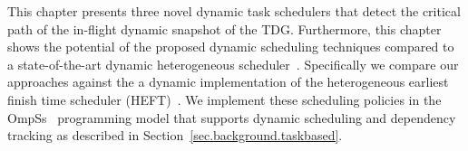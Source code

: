 

This chapter presents three novel dynamic task schedulers that detect the critical path of the in-flight dynamic snapshot of the TDG. 
Furthermore, this chapter shows the potential of the proposed dynamic scheduling techniques compared to a state-of-the-art dynamic heterogeneous scheduler~\cite{HEFT}.
Specifically we compare our approaches against the a dynamic implementation of the heterogeneous earliest finish time scheduler (HEFT)~\cite{HEFT}.
We implement these scheduling policies in the OmpSs~\cite{OmpSs_PPL11,OmpSs} programming model that supports dynamic scheduling and dependency tracking as described in Section~\ref{sec.background.taskbased}.



